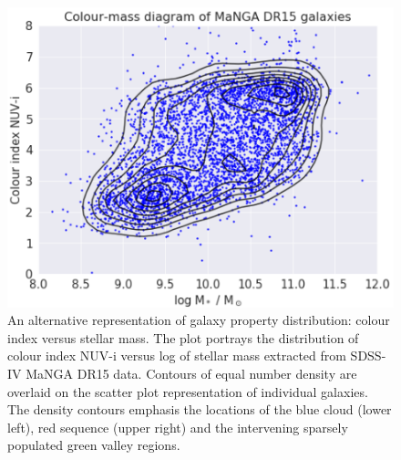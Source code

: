 \begin{figure}
    \centering
    \includegraphics[width=\columnwidth]{images/CMDs/CMD-DR15-ALL-15.png}
    \caption[Colour-mass diagram of the complete MaNGA DR15 galaxy population]{An alternative representation of galaxy property distribution: colour index versus stellar mass. The plot portrays the distribution of colour index NUV-i versus log of stellar mass extracted from SDSS-IV MaNGA DR15 data. Contours of equal number density are overlaid on the scatter plot representation of individual galaxies. The density contours emphasis the locations of the blue cloud (lower left), red sequence (upper right) and the intervening sparsely populated green valley regions. }
    \label{fig:CMD-mass-1}
\end{figure}

